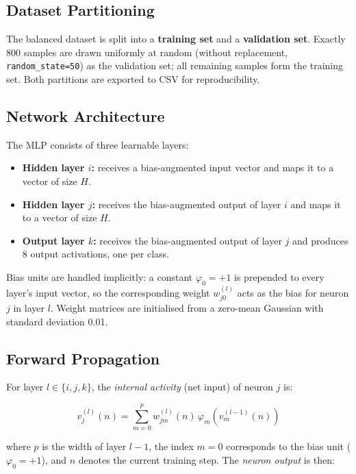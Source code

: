 \documentclass{acm_proc_article-sp}
\begin{document}
\subsection{Dataset Partitioning}

The balanced dataset is split into a \textbf{training set} and a
\textbf{validation set}.  Exactly 800 samples are drawn uniformly at
random (without replacement, \texttt{random\_state=50}) as the validation
set; all remaining samples form the training set.  Both partitions are
exported to CSV for reproducibility.

\subsection{Network Architecture}

The MLP consists of three learnable layers:
\begin{itemize}
  \item \textbf{Hidden layer $i$:} receives a bias-augmented input vector
        and maps it to a vector of size $H$.
  \item \textbf{Hidden layer $j$:} receives the bias-augmented output of
        layer $i$ and maps it to a vector of size $H$.
  \item \textbf{Output layer $k$:} receives the bias-augmented output of
        layer $j$ and produces 8 output activations, one per class.
\end{itemize}

Bias units are handled implicitly: a constant $\varphi_0 = +1$ is
prepended to every layer's input vector, so the corresponding weight
$w^{(l)}_{j0}$ acts as the bias for neuron $j$ in layer $l$.  Weight
matrices are initialised from a zero-mean Gaussian with standard
deviation 0.01.

\subsection{Forward Propagation}

For layer $l \in \{i, j, k\}$, the \textit{internal activity} (net
input) of neuron $j$ is:

\begin{equation}
  v^{(l)}_j(n) = \sum_{m=0}^{p} w^{(l)}_{jm}(n)\,
  \varphi_m\!\left(v^{(l-1)}_m(n)\right)
  \label{eq:internal}
\end{equation}

where $p$ is the width of layer $l-1$, the index $m=0$ corresponds to
the bias unit ($\varphi_0 = +1$), and $n$ denotes the current training
step.  The \textit{neuron output} is then:
\end{document}
